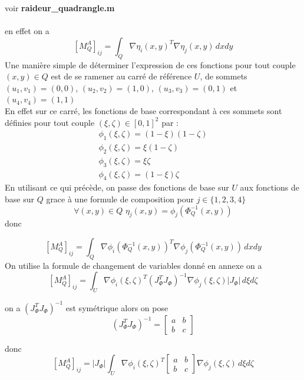 \documentclass{article}
\begin{document}
voir \textbf{raideur\_quadrangle.m} \\ \\
en effet on a 
$$
[M_{Q}^{A}]_{ij} = \int_Q \nabla \eta_{i}(x, y)^{T} \nabla \eta_{j}(x, y) \,dx dy
$$
Une manière simple de déterminer l'expression de ces fonctions pour tout couple $(x, y) \in Q$ est de se ramener au carré de référence $U$,
de sommets $(u_1, v_1) = (0, 0)$, $(u_2, v_2) = (1, 0)$, $(u_3, v_3) = (0, 1)$ et $(u_4, v_4) = (1, 1)$ \\
En effet sur ce carré, les fonctions de base correspondant à ces sommets sont définies pour tout couple $(\xi, \zeta) \in [0, 1]^2$ par :
\begin{gather*} 
    \phi_1(\xi, \zeta) = (1 - \xi)(1 - \zeta) \\
    \phi_2(\xi, \zeta) = \xi(1 - \zeta) \\
    \phi_3(\xi, \zeta) = \xi \zeta \\
    \phi_4(\xi, \zeta) = (1 - \xi) \zeta
\end{gather*}
En utilisant ce qui précède, on passe des fonctions de base sur $U$ aux fonctions de base sur $Q$ grace
à une formule de composition pour $j \in \{1,2,3,4\}$
$$
\forall (x, y) \in Q \, \, \eta_{j}(x, y) = \phi_{j}(\Phi^{-1}_{Q}(x, y))
$$
donc 

$$
[M_{Q}^{A}]_{ij} = \int_Q \nabla \phi_i(\Phi^{-1}_{Q}(x, y))^{T} \nabla \phi_j(\Phi^{-1}_{Q}(x, y)) \,dx dy
$$
On utilise la formule de changement de variables donné en annexe on a 
$$
[M_{Q}^{A}]_{ij} = \int_U \nabla \phi_i(\xi, \zeta)^{T} (J_{\Phi}^{T} J_{\Phi})^{-1} \nabla \phi_j(\xi, \zeta) |J_{\Phi}| \,d \xi d \zeta
$$

on a $(J_{\Phi}^{T} J_{\Phi})^{-1}$ est symétrique alors on pose
$$
(J_{\Phi}^{T} J_{\Phi})^{-1} =
\begin{bmatrix}
    a & b \\
    b & c
\end{bmatrix}
$$

donc
$$
[M_{Q}^{A}]_{ij} = |J_{\Phi}| \int_U \nabla \phi_i(\xi, \zeta)^{T} 
\begin{bmatrix}
    a & b \\
    b & c
\end{bmatrix}
\nabla \phi_j(\xi, \zeta) \,d \xi d \zeta
$$
\end{document}
